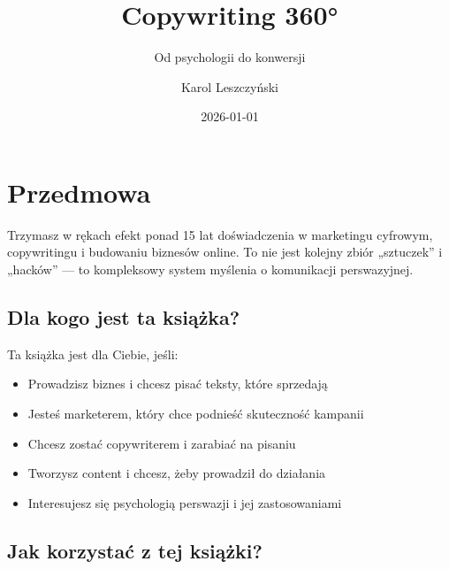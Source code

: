 \documentclass[
  12pt,
  a4paper,
  twoside,
  openright,
  12pt,
  DIV=12,
  BCOR=12mm]{scrbook}
\title{Copywriting 360°}
\subtitle{Od psychologii do konwersji}
\author{Karol Leszczyński}
\date{2026-01-01}
\providecommand{\tightlist}{%
  \setlength{\itemsep}{0pt}\setlength{\parskip}{0pt}}\usepackage{longtable,booktabs,array}
\renewcommand*\contentsname{Spis treści}
\newcommand\contentsname{Spis treści}
\begin{document}
\frontmatter
\maketitle

\pagecolor{deepnavy}

\pagecolor{white}
\null\thispagestyle{empty}\clearpage


\renewcommand*\contentsname{Spis treści}
{
\setcounter{tocdepth}{1}
\tableofcontents
}

\mainmatter
{}

\chapter*{Przedmowa}\label{przedmowa}


Trzymasz w rękach efekt ponad 15 lat doświadczenia w marketingu
cyfrowym, copywritingu i budowaniu biznesów online. To nie jest kolejny
zbiór „sztuczek'' i „hacków'' --- to kompleksowy system myślenia o
komunikacji perswazyjnej.

\section*{Dla kogo jest ta
książka?}\label{dla-kogo-jest-ta-ksiux105ux17cka}


Ta książka jest dla Ciebie, jeśli:

\begin{itemize}
\tightlist
\item
  Prowadzisz biznes i chcesz pisać teksty, które sprzedają
\item
  Jesteś marketerem, który chce podnieść skuteczność kampanii
\item
  Chcesz zostać copywriterem i zarabiać na pisaniu
\item
  Tworzysz content i chcesz, żeby prowadził do działania
\item
  Interesujesz się psychologią perswazji i jej zastosowaniami
\end{itemize}

\section*{Jak korzystać z tej
książki?}\label{jak-korzystaux107-z-tej-ksiux105ux17cki}
\end{document}
